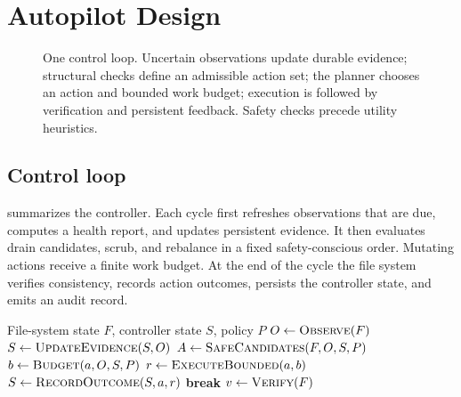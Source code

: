 \section{Autopilot Design}
\label{sec:design}

\begin{figure}[t]
  \centering
  \resizebox{0.96\textwidth}{!}{}
  \caption{One \autopilot{} control loop. Uncertain observations update durable evidence; structural checks define an admissible action set; the planner chooses an action and bounded work budget; execution is followed by verification and persistent feedback. Safety checks precede utility heuristics.}
  \label{fig:autopilot-overview}
\end{figure}



\subsection{Control loop}
\label{sec:control-loop}
 summarizes the controller. Each cycle first refreshes observations that are due, computes a health report, and updates persistent evidence. It then evaluates drain candidates, scrub, and rebalance in a fixed safety-conscious order. Mutating actions receive a finite work budget. At the end of the cycle the file system verifies consistency, records action outcomes, persists the controller state, and emits an audit record.

\begin{algorithm}[t]
  \caption{Safety-first maintenance cycle}
  \label{alg:autopilot}
  \begin{algorithmic}[1]
    \Require File-system state $F$, controller state $S$, policy $P$
    \State $O \gets \Call{Observe}{F}$
    \State $S \gets \Call{UpdateEvidence}{S,O}$
      \State \Return {}
    \EndIf
    \State $A \gets \Call{SafeCandidates}{F,O,S,P}$
      \State $b \gets \Call{Budget}{a,O,S,P}$
        \State $r \gets \Call{ExecuteBounded}{a,b}$
        \State $S \gets \Call{RecordOutcome}{S,a,r}$
      \EndIf
        \State \textbf{break}
      \EndIf
    \EndFor
    \State $v \gets \Call{Verify}{F}$
    \State \Return {}
  \end{algorithmic}
\end{algorithm}

